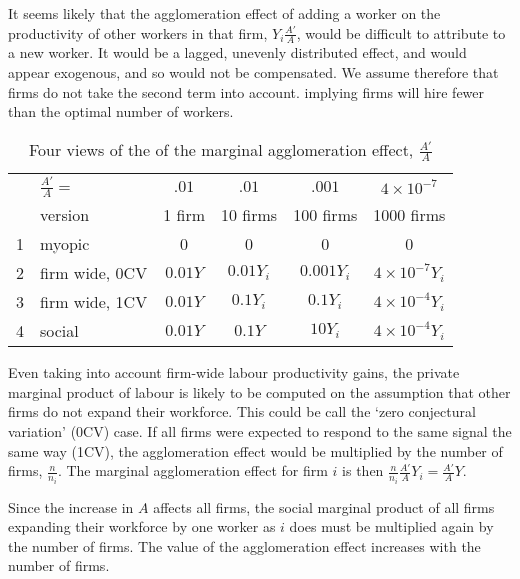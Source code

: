 It seems likely that the agglomeration effect of adding a worker on the productivity of other workers in that firm, $Y_i \frac{A'}{A}$, would be difficult to attribute to a new worker. It would be a lagged, unevenly distributed effect, and would appear exogenous, and so would not be compensated. We assume therefore that firms do not take the second term into account. %
implying firms will hire fewer than the optimal number of workers.
\begin{table}[htbp]
\caption{Four views of the of the marginal agglomeration effect, $\frac{A'}{A}$}
\begin{center}
\begin{tabular}{rlcccc}\small
    & 	\hspace{2cm}$\frac{A'}{A}=$	& $.01$ & $.01$ & $.001$  &  $4\times 10^{-7}$\\ \cline{3-4}
\   &  	version  		& 1 firm 		&10 firms		&100 firms 	& 1000 firms		\\ \hline%
 1 &myopic 		&0 			& 0			& 0       		&	0				\\
 2 &firm wide, 0CV 	& $0.01Y$		& $0.01Y_i$	& $0.001Y_i$	& $4\times 10^{-7}Y_i$	\\
 3 &firm wide, 1CV	& $0.01Y$		& $0.1Y_i	$	& $0.1Y_i$	&$4\times 10^{-4}Y_i$	\\
4  &social 			& $0.01Y$ 	&  $0.1Y$		& $10Y_i$		&$4\times 10^{-4}Y_i$	\\
 \hline
\end{tabular}
\end{center}
\label{table-marginal-agglomeration}
\end{table}%


Even taking into account firm-wide labour productivity gains, the private marginal product of labour is likely to be computed on the assumption that other firms do not expand  their workforce. This could be call the `zero conjectural variation' (0CV) case. If all firms  were expected to respond to the same signal the same way (1CV), the agglomeration effect  would be multiplied by the number of firms, $\frac{n }{n_i}$. The marginal agglomeration effect for firm $i$ is then $\frac{n }{n_i}\frac{A' }{A}Y_i =\frac{A' }{A}Y$. 

Since the increase in $A$ affects all firms, the  social marginal product of all firms expanding their workforce by one worker as $i$ does must be multiplied again by the number of firms. The  value of the agglomeration effect increases with the number of firms. 


